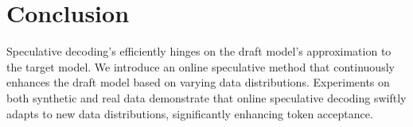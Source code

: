 \section{Conclusion}
Speculative decoding's efficiently hinges on the draft model's approximation to the target model.
We introduce an online speculative method that continuously enhances the draft model based on varying data distributions. Experiments on both synthetic and real data demonstrate that online speculative decoding swiftly adapts to new data distributions, significantly enhancing token acceptance.
